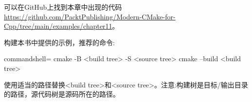 可以在GitHub上找到本章中出现的代码 \url{https://github.com/PacktPublishing/Modern-CMake-for-Cpp/tree/main/examples/chapter11}。

构建本书中提供的示例，推荐的命令:

\begin{tcblisting}{commandshell={}}
cmake -B <build tree> -S <source tree>
cmake --build <build tree>
\end{tcblisting}

使用适当的路径替换<build tree>和<source tree>。注意:构建树是目标/输出目录的路径，源代码树是源码所在的路径。